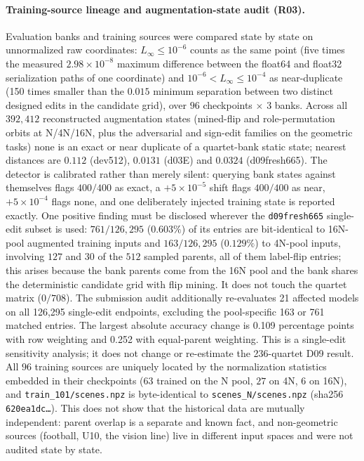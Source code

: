 \paragraph{Training-source lineage and augmentation-state audit (R03).} Evaluation banks and training sources were compared state by state on unnormalized raw coordinates: $L_\infty\le10^{-6}$ counts as the same point (five times the measured $2.98\times10^{-8}$ maximum difference between the float64 and float32 serialization paths of one coordinate) and $10^{-6}<L_\infty\le10^{-4}$ as near-duplicate (150 times smaller than the $0.015$ minimum separation between two distinct designed edits in the candidate grid), over $96$ checkpoints $\times$ $3$ banks. Across all $392{,}412$ reconstructed augmentation states (mined-flip and role-permutation orbits at N/4N/16N, plus the adversarial and sign-edit families on the geometric tasks) none is an exact or near duplicate of a quartet-bank static state; nearest distances are $0.112$ (dev512), $0.0131$ (d03E) and $0.0324$ (d09fresh665). The detector is calibrated rather than merely silent: querying bank states against themselves flags $400/400$ as exact, a $+5\times10^{-5}$ shift flags $400/400$ as near, $+5\times10^{-4}$ flags none, and one deliberately injected training state is reported exactly. One positive finding must be disclosed wherever the \texttt{d09fresh665} single-edit subset is used: $761/126{,}295$ ($0.603\%$) of its entries are bit-identical to 16N-pool augmented training inputs and $163/126{,}295$ ($0.129\%$) to 4N-pool inputs, involving $127$ and $30$ of the $512$ sampled parents, all of them label-flip entries; this arises because the bank parents come from the 16N pool and the bank shares the deterministic candidate grid with flip mining. It does not touch the quartet matrix ($0/708$). The submission audit additionally re-evaluates 21 affected models on all 126,295 single-edit endpoints, excluding the pool-specific 163 or 761 matched entries. The largest absolute accuracy change is 0.109 percentage points with row weighting and 0.252 with equal-parent weighting. This is a single-edit sensitivity analysis; it does not change or re-estimate the 236-quartet D09 result. All $96$ training sources are uniquely located by the normalization statistics embedded in their checkpoints ($63$ trained on the N pool, $27$ on 4N, $6$ on 16N), and \texttt{train\_101/scenes.npz} is byte-identical to \texttt{scenes\_N/scenes.npz} (sha256 \texttt{620ea1dc\ldots}). This does not show that the historical data are mutually independent: parent overlap is a separate and known fact, and non-geometric sources (football, U10, the vision line) live in different input spaces and were not audited state by state.
